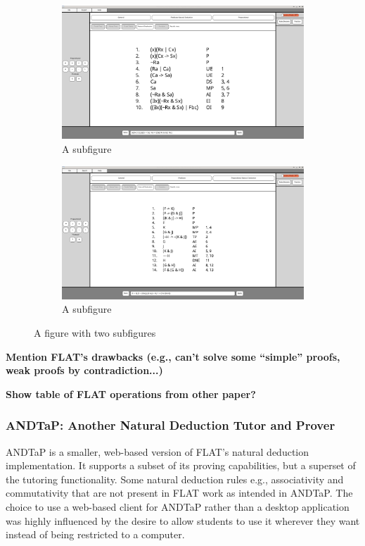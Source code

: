 \documentclass[ms]{uncgdissertationexp2}
\theoremstyle{plain}
\theoremstyle{definition}
\theoremstyle{remark}
\begin{document}
\begin{figure}[h!]
	\centering
	\begin{subfigure}{.5\textwidth}
		\centering
        \includegraphics[width=0.9\linewidth]{flat1.png}
		\caption{A subfigure}
		\label{fig:flat1}
	\end{subfigure}%
	\begin{subfigure}{.5\textwidth}
		\centering
		\includegraphics[width=0.9\linewidth]{flat2.png}
		\caption{A subfigure}
		\label{fig:flat2}
	\end{subfigure}
	\caption{A figure with two subfigures}
	\label{fig:flatfigures}
\end{figure}

\textbf{Mention FLAT's drawbacks (e.g., can't solve some ``simple'' proofs, weak proofs by contradiction...)}

\textbf{Show table of FLAT operations from other paper?}

\subsubsection{ANDTaP: Another Natural Deduction Tutor and Prover}
ANDTaP is a smaller, web-based version of FLAT's natural deduction implementation. It supports a subset of its proving capabilities, but a superset of the tutoring functionality. Some natural deduction rules e.g., associativity and commutativity that are not present in FLAT work as intended in ANDTaP. The choice to use a web-based client for ANDTaP rather than a desktop application was highly influenced by the desire to allow students to use it wherever they want instead of being restricted to a computer.
\end{document}
